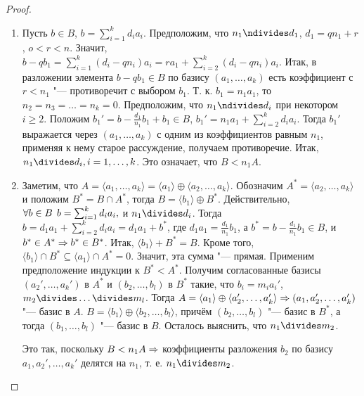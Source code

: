 \documentclass[main]{subfiles}
\begin{document}
\begin{proof}
\begin{enumerate}
    \item Пусть \( b \in B \), \( b = \sum_{i = 1}^k d_i a_i \).
      Предположим, что \( n_1 \ndivides d_1 \), \( d_1 = q n_1 + r\),
      \( o < r < n \). Значит, \( b - q b_1 = \sum_{i = 1}^k (d_i - q n_i)a_i =
      r a_1 + \sum_{i = 2}^k (d_i - q n_i) a_i \).
      Итак, в разложении элемента \( b - qb_1 \in B \) по базису
      \( (a_1, \dots, a_k) \) есть коэффициент с \( r < n_1 \) "---
      противоречит с выбором \( b_1 \).
      Т. к. \( b_1 = n_1 a_1 \), то \( n_2 = n_3 = \dots = n_k = 0 \).
      Предположим, что \( n_1 \ndivides d_i \)
      при некотором \( i \ge 2 \).
      Положим \( b_1' = b - \frac{d_1}{n_1} b_1 + b_1 \in B \),
      \( b_1' = n_1 a_1 + \sum_{i = 2}^k d_i a_i \). Тогда
      \( b_1' \) выражается через \( (a_1, \dots, a_k) \) с одним
      из коэффициентов равным \( n_1 \),
      применяя к нему старое рассуждение,
      получаем противоречие.
      Итак, \( n_1 \divides d_i, i = 1, \dots, k \). Это означает,
      что \( B < n_1 A \).

    \item Заметим, что \( A = \langle a_1, \dots, a_k \rangle =
      \langle a_1 \rangle \oplus \langle a_2, \dots, a_k \rangle \).
      Обозначим \( A^* = \langle a_2, \dots, a_k \rangle \) и
      положим \( B^* = B \cap A^* \),
      тогда
      \( B = \langle b_1 \rangle \oplus B^* \).
      Действительно,
      \(
	\forall {b \in B} \; \, b = \sum_{i = 1}^k d_i a_i,
      \)
      и \( n_1 \divides d_i \).
      Тогда \( b = d_1 a_1 + \sum_{i = 2}^k d_i a_i = d_1 a_1 +  b^*  \), где
      \( d_1 a_1 = \frac{d_1}{n_1} b_1 \), а \( b^* = b - \frac{d_1}{n_1} b_1 \in B \),
      и \( b^* \in A^* \Rightarrow b^* \in B^* \). Итак, \( \langle b_1 \rangle + B^* = B \).
      Кроме того, \( \langle b_1 \rangle \cap B^* \subseteq
      \langle a_1 \rangle \cap A^* = 0 \). Значит, эта сумма "--- прямая.
      Применим предположение индукции к \( B^* < A^* \).
      Получим согласованные базисы
      \( (a_2', \dots, a_k') \) в \( A^* \) и
      \( (b_2, \dots, b_l) \) в \( B^* \) такие, что
      \( b_i = m_i a_i' \), \( m_2 \divides \dots \divides m_l \).
      Тогда \( A = \langle a_1 \rangle \oplus \langle a_2', \dots, a_k' \rangle \Rightarrow
      (a_1, a_2', \dots, a_k') \) "--- базис в \( A \).
      \( B = \langle b_1 \rangle \oplus \langle b_2, \dots, b_l \rangle \),
      причём \( (b_2, \dots, b_l) \) "--- базис в \( B^* \), а тогда
      \( (b_1, \dots, b_l) \) "--- базис в \( B \).
      Осталось выяснить, что \( n_1 \divides m_2 \).

      Это так, поскольку \( B < n_1 A \Rightarrow \) коэффициенты разложения \( b_2 \)
      по базису \( a_1, a_2', \dots, a_k' \) делятся на \( n_1 \),
      т. е. \( n_1 \divides m_2 \).
      \qedhere
  \end{enumerate}
\end{proof}
\end{document}
